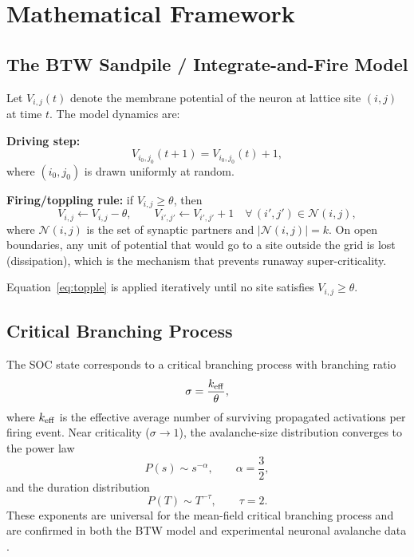 \documentclass[12pt,a4paper]{article}
\begin{document}
\section{Mathematical Framework}
\label{sec:theory}

\subsection{The BTW Sandpile / Integrate-and-Fire Model}

Let $V_{i,j}(t)$ denote the membrane potential of the neuron at lattice
site $(i,j)$ at time $t$.  The model dynamics are:

\textbf{Driving step:}
\begin{equation}
  V_{i_0,j_0}(t+1) = V_{i_0,j_0}(t) + 1,
  \label{eq:drive}
\end{equation}
where $(i_0, j_0)$ is drawn uniformly at random.

\textbf{Firing/toppling rule:} if $V_{i,j} \geq \theta$, then
\begin{equation}
  V_{i,j} \leftarrow V_{i,j} - \theta, \qquad
  V_{i',j'} \leftarrow V_{i',j'} + 1 \quad \forall\, (i',j') \in \mathcal{N}(i,j),
  \label{eq:topple}
\end{equation}
where $\mathcal{N}(i,j)$ is the set of synaptic partners and
$|\mathcal{N}(i,j)| = k$.  On open boundaries, any unit of potential
that would go to a site outside the grid is lost (dissipation), which
is the mechanism that prevents runaway super-criticality.

Equation~\eqref{eq:topple} is applied iteratively until no site
satisfies $V_{i,j} \geq \theta$.

\subsection{Critical Branching Process}

The SOC state corresponds to a critical branching process with
branching ratio
\begin{equation}
  \sigma = \frac{k_{\rm eff}}{\theta},
  \label{eq:sigma}
\end{equation}
where $k_{\rm eff}$ is the effective average number of surviving
propagated activations per firing event.  Near criticality
($\sigma \to 1$), the avalanche-size distribution converges to the
power law
\begin{equation}
  P(s) \sim s^{-\alpha}, \qquad \alpha = \frac{3}{2},
  \label{eq:powerlaw_s}
\end{equation}
and the duration distribution
\begin{equation}
  P(T) \sim T^{-\tau}, \qquad \tau = 2.
  \label{eq:powerlaw_T}
\end{equation}
These exponents are universal for the mean-field critical branching
process and are confirmed in both the BTW model and experimental
neuronal avalanche data \cite{beggs2003,zapperi1995}.
\end{document}

